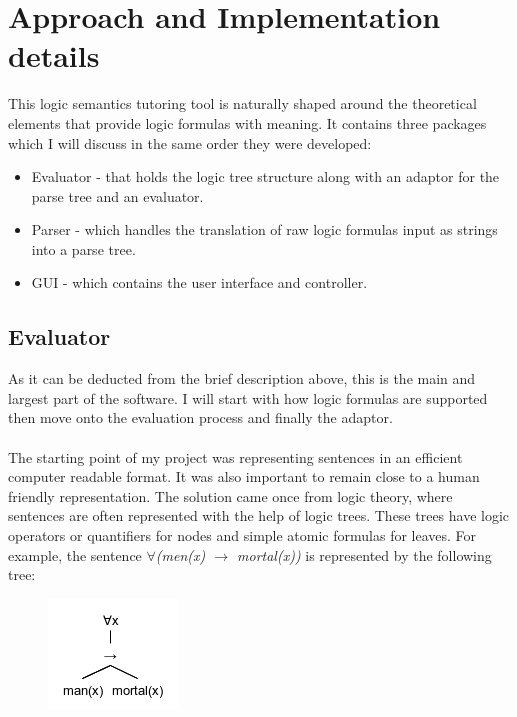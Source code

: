 \documentclass{report}
\begin{document}

\chapter{Approach and Implementation details}

This logic semantics tutoring tool is naturally shaped around the theoretical 
elements that provide logic formulas with meaning. It contains three packages 
which I will discuss in the same order they were developed:

  \begin{itemize}
  \item Evaluator - that holds the logic tree structure along with an adaptor 
  for the parse tree and an evaluator.
  \item Parser - which handles the translation of raw logic formulas input as 
  strings into a parse tree.
  \item GUI - which contains the user interface and controller.
  \end{itemize}

\section{Evaluator}
As it can be deducted from the brief description above, this is the main and 
largest part of the software. I will start with how logic formulas are supported 
then move onto the evaluation process and finally the adaptor. 
\\ \\
The starting point of my project was representing sentences in an efficient 
computer readable format. It was also important to remain close to a human 
friendly representation. The solution came once from logic theory, where 
sentences are often represented with the help of logic trees. These trees have 
logic operators or quantifiers for nodes and simple atomic formulas for leaves. 
For example, the sentence \emph{$\forall$(men(x) $\rightarrow$ mortal(x))} is 
represented by the following tree:

\newpage
\begin{figure}[h!]
\centering \includegraphics{mortal.png}
\end{figure}
\end{document}
